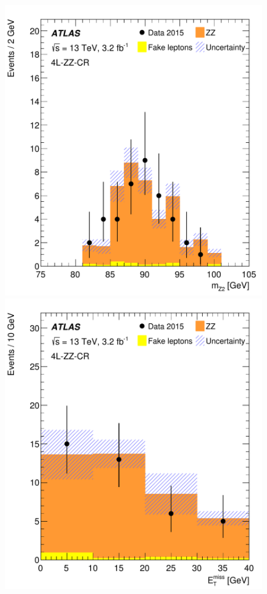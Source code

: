 \begin{figure}[htbp]
\includegraphics[width=\twofigwidth]{CRZZMZ2}
\includegraphics[width=\twofigwidth]{CRZZMET}

\end{figure}
